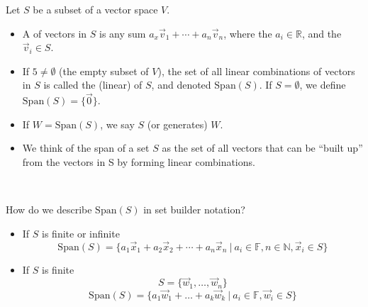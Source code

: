 \documentclass[11pt,fleqn]{book} %
\begin{document}
\setcounter{section}{3}
\setcounter{definitionT}{0}
\begin{definition}
    Let $S$ be a subset of a vector space $V$.
    
    \begin{itemize}
        \item A  of vectors in $S$ is any sum $a_x\vec{v}_1 + \cdots + a_n\vec{v}_n$, where the $a_i \in \mathbb{R}$, and the $\vec{v}_i \in S$.

        \item If $5 \neq \emptyset$ (the empty subset of $V$), the set of all linear combinations of vectors in $S$ is called the (linear)  of $S$, and denoted $\mathrm{Span}(S)$. If $S = \emptyset$, we define $\mathrm{Span}(S) = \{ \vec{0} \}$.

        \item If $W = \mathrm{Span}(S)$, we say $S$  (or generates) $W$.

        \item We think of the span of a set $S$ as the set of all vectors that can be ``built up'' from the vectors in S by forming linear combinations.
    \end{itemize}
\end{definition}
\setcounter{section}{4}

{~~~}

How do we describe $\mathrm{Span}(S)$ in set builder notation? 
\begin{itemize}
  \item If $S$ is finite or infinite 
  $$\mathrm{Span}(S) = \{ a_1\vec{x}_1 + a_2\vec{x}_2 + \cdots + a_n\vec{x}_n ~|~ a_i \in \mathbb{F}, n \in \mathbb{N}, \vec{x}_i \in S \}$$

  \item If $S$ is finite 
  $$S = \{ \vec{w}_1 , \dots, \vec{w}_n \}$$ 
  $$\mathrm{Span}\left( S \right) = \{ a_1\vec{w}_1 + \dots + a_k\vec{w}_k ~|~ a_i \in \mathbb{F}, \vec{w}_i \in S \}$$
\end{itemize}
\end{document}
